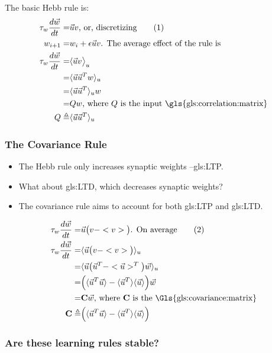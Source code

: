 \documentclass[]{article}
\newcommand\numberthis{\addtocounter{equation}{1}\tag{\theequation}}
\begin{document}
The basic Hebb rule is:
\begin{align*}
	\tau_w \frac{d\vec{w}}{dt} =& \vec{u} v\text{, or, discretizing} \numberthis \label{eq:hebbs:rule}\\
	w_{i+1} =& w_i + \epsilon  \vec{u} v \text{. The average effect of the rule is}\\
	\tau_w \frac{d\vec{w}}{dt} =& \langle\vec{u} v\big>_u\\
	 =& \langle\vec{u} \vec{u}^Tw\rangle_u\\
	 =& \langle\vec{u} \vec{u}^T\rangle_u w\\
	 =& Qw \text{, where $Q$ is the input \gls{gls:correlation:matrix}}\\
	 Q \triangleq& \langle\vec{u} \vec{u}^T\rangle_u
\end{align*}

\subsubsection{The Covariance Rule}
\begin{itemize}
	\item The Hebb rule only increases synaptic weights --\gls{gls:LTP}.
	\item  What about \gls{gls:LTD}, which decreases synaptic weights?
	\item  The covariance rule aims to account for both \gls{gls:LTP} and \gls{gls:LTD}.
\end{itemize}

\begin{align*}
	\tau_w \frac{d\vec{w}}{dt} =& \vec{u}\big(v-<v>\big) \text{. On average} \numberthis \label{eq:covariance:rule}\\
	\tau_w \frac{d\vec{w}}{dt} =& \langle \vec{u}\big(v-<v>\big) \rangle_u\\
	=& \langle \vec{u}\big(\vec{u}^T-<\vec{u}>^T\big) \vec{w}\rangle_u\\
	=& \Big( \langle \vec{u}^T \vec{u}\rangle - \langle \vec{u}^T \rangle \langle\vec{u}\rangle\Big)\vec{w} \\
	=& \mathbf{C} \vec{w} \text{, where $\mathbf{C}$ is the \Gls{gls:covariance:matrix}}\\
	\mathbf{C}\triangleq& \Big( \langle \vec{u}^T \vec{u}\rangle - \langle \vec{u}^T \rangle \langle\vec{u}\rangle\Big)
\end{align*}

\subsubsection{Are these learning rules stable?}
\end{document}
